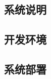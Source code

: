 \documentclass[fontset=windows]{ctexart}
\numberwithin{figure}{section}
\begin{document}
\newpage
\begin{appendices}
	\section{系统说明}

	\subsection{开发环境}

	\subsection{系统部署}

\end{appendices}
\end{document}
